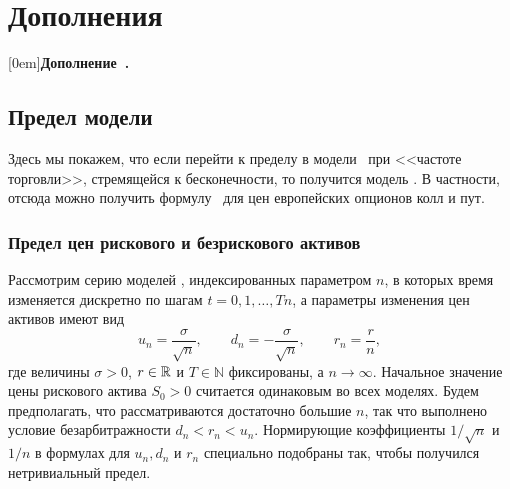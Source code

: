 \stopchaptertoc

\part{Дополнения}
[0em]{}{\textbf{Дополнение\ \thecontentslabel.}\hspace{2mm}}{}{\dotfill\contentspage}
\setcounter{chapter}{0}
\renewcommand{\theHchapter}{A\arabic{chapter}}%


\chapter{Предел модели \crr}
\label{ch:crr-limit}

Здесь мы покажем, что если перейти к пределу в модели \crr\ при <<частоте торговли>>, стремящейся к бесконечности, то получится модель \bs.
В частности, отсюда можно получить формулу \bs\ для цен европейских опционов колл и пут.

\section{Предел цен рискового и безрискового активов}

Рассмотрим серию моделей \crr, индексированных параметром $n$, в которых время изменяется дискретно по шагам $t=0,1,\dots,Tn$, а параметры изменения цен активов имеют вид
\[
u_n = \frac{\sigma}{\sqrt n}, \qquad d_n = -\frac{\sigma}{\sqrt n}, \qquad r_n = \frac{r}{n},
\]
где величины $\sigma>0$, $r\in \mathbb{R}$ и $T\in\mathbb{N}$ фиксированы, а $n\to\infty$. Начальное значение цены рискового актива $S_0>0$ считается одинаковым во всех моделях. 
Будем предполагать, что рассматриваются достаточно большие $n$, так что выполнено условие безарбитражности $d_n < r_n < u_n$.
Нормирующие коэффициенты $1/\sqrt{n}$ и $1/n$ в формулах для $u_n,d_n$ и $r_n$ специально подобраны так, чтобы получился нетривиальный предел.

